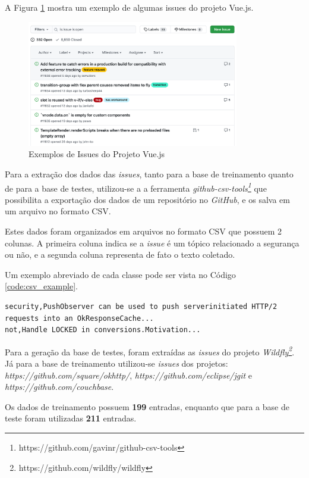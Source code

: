 \documentclass[conference]{IEEEtran}
\begin{document}
A Figura \ref{fig:issues_example} mostra um exemplo de algumas issues do projeto Vue.js.

\begin{figure}[htbp]
    \centerline{\includegraphics[width=25em]{images/issues_example.png}}
    \caption{Exemplos de Issues do Projeto Vue.js}
    \label{fig:issues_example}
\end{figure}

Para a extração dos dados das \textit{issues}, tanto para a base de treinamento quanto de para a base de testes, utilizou-se a a ferramenta \textit{github-csv-tools\footnote{https://github.com/gavinr/github-csv-tools}} que possibilita a exportação dos dados de um repositório no \textit{GitHub}, e os salva em um arquivo no formato CSV.

Estes dados foram organizados em arquivos no formato CSV que possuem 2 colunas. A primeira coluna indica se a \textit{issue} é um tópico relacionado a segurança ou não, e a segunda coluna representa de fato o texto coletado.

Um exemplo abreviado de cada classe pode ser vista no Código \ref{code:csv_example}.

\begin{lstlisting}[caption={CSV Exemplo com Base de Dados},captionpos=b,frame=single,label={code:csv_example}]
security,PushObserver can be used to push serverinitiated HTTP/2 requests into an OkResponseCache...
not,Handle LOCKED in conversions.Motivation...
\end{lstlisting}

Para a geração da base de testes, foram extraídas as \textit{issues} do projeto \textit{Wildfly\footnote{https://github.com/wildfly/wildfly}}. Já para a base de treinamento utilizou-se \textit{issues} dos projetos: \textit{https://github.com/square/okhttp/}, \textit{https://github.com/eclipse/jgit} e \textit{https://github.com/couchbase}.

Os dados de treinamento possuem \textbf{199} entradas, enquanto que para a base de teste foram utilizadas \textbf{211} entradas.
\end{document}
